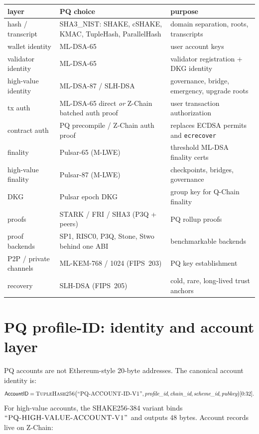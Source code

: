 \documentclass[11pt,a4paper]{article}
\newcommand{\PQ}{\textsf{PQ}}
\begin{document}
\begin{center}\small
\begin{tabular}{l l l}
\toprule
layer & \PQ{} choice & purpose \\
\midrule
hash / transcript & SHA3\_NIST: SHAKE, cSHAKE, KMAC, TupleHash, ParallelHash & domain separation, roots, transcripts \\
wallet identity & ML-DSA-65 & user account keys \\
validator identity & ML-DSA-65 & validator registration + DKG identity \\
high-value identity & ML-DSA-87 / SLH-DSA & governance, bridge, emergency, upgrade roots \\
tx auth & ML-DSA-65 direct \emph{or} Z-Chain batched auth proof & user transaction authorization \\
contract auth & \PQ{} precompile / Z-Chain auth proof & replaces ECDSA permits and \texttt{ecrecover} \\
finality & Pulsar-65 (M-LWE) & threshold ML-DSA finality certs \\
high-value finality & Pulsar-87 (M-LWE) & checkpoints, bridges, governance \\
DKG & Pulsar epoch DKG & group key for Q-Chain finality \\
proofs & STARK / FRI / SHA3 (P3Q + peers) & \PQ{} rollup proofs \\
proof backends & SP1, RISC0, P3Q, Stone, Stwo behind one ABI & benchmarkable backends \\
P2P / private channels & ML-KEM-768 / 1024 (FIPS~203) & \PQ{} key establishment \\
recovery & SLH-DSA (FIPS~205) & cold, rare, long-lived trust anchors \\
\bottomrule
\end{tabular}
\end{center}

\section{PQ profile-ID: identity and account layer}
\label{sec:pq-id}

\PQ{} accounts are not Ethereum-style 20-byte addresses. The
canonical account identity is:
\[
\textsf{AccountID} = \textsc{TupleHash256}\big(\textsc{``PQ-ACCOUNT-ID-V1''},
\textit{profile\_id}, \textit{chain\_id}, \textit{scheme\_id},
\textit{pubkey}\big)[0{:}32].
\]
For high-value accounts, the SHAKE256-384 variant binds
$\textsc{``PQ-HIGH-VALUE-ACCOUNT-V1''}$ and outputs 48 bytes.
Account records live on Z-Chain:
\end{document}
